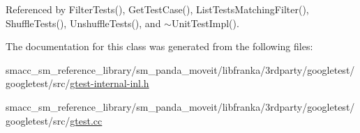 Referenced by Filter\+Tests(), Get\+Test\+Case(), List\+Tests\+Matching\+Filter(), Shuffle\+Tests(), Unshuffle\+Tests(), and $\sim$\+Unit\+Test\+Impl().



The documentation for this class was generated from the following files\+:\begin{DoxyCompactItemize}
\item 
smacc\+\_\+sm\+\_\+reference\+\_\+library/sm\+\_\+panda\+\_\+moveit/libfranka/3rdparty/googletest/googletest/src/\hyperlink{gtest-internal-inl_8h}{gtest-\/internal-\/inl.\+h}\item 
smacc\+\_\+sm\+\_\+reference\+\_\+library/sm\+\_\+panda\+\_\+moveit/libfranka/3rdparty/googletest/googletest/src/\hyperlink{gtest_8cc}{gtest.\+cc}\end{DoxyCompactItemize}
